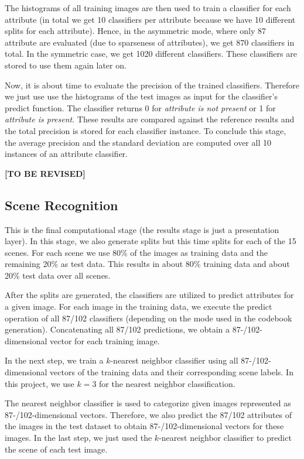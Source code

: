 \documentclass{vldb}
\newcommand{\tbr}{{\color{red}\textbf{[TO BE REVISED]}}}
\begin{document}
The histograms of all training images are then used to train a classifier for each
attribute (in total we get 10 classifiers per attribute because we have 10
different splits for each attribute). Hence, in the asymmetric mode, where only
87 attribute are evaluated (due to sparseness of attributes), we get 870
classifiers in total. In the symmetric case, we get 1020 different classifiers.
These classifiers are stored to use them again later on.

Now, it is about time to evaluate the precision of the trained classifiers.
Therefore we just use use the histograms of the test images as input for the
classifier's predict function. The classifier returns 0 for \emph{attribute is
not present} or 1 for \emph{attribute is present}. These results are compared
against the reference results and the total precision is stored for each
classifier instance. To conclude this stage, the average precision and the
standard deviation are computed over all 10 instances of an attribute classifier.

\tbr

\subsection{Scene Recognition}
\label{subsec:scene-recognition}

This is the final computational stage (the results stage is just a presentation
layer). In this stage, we also generate splits but this time splits for each of
the 15 scenes. For each scene we use 80\% of the images as training data and the
remaining 20\% as test data. This results in about 80\% training data and about
20\% test data over all scenes.

After the splits are generated, the classifiers are utilized to predict attributes
for a given image. For each image in the training data, we execute the predict
operation of all 87/102 classifiers (depending on the mode used in the codebook
generation). Concatenating all 87/102 predictions, we obtain a 87-/102-dimensional
vector for each training image.

In the next step, we train a $k$-nearest neighbor classifier using all
87-/102-dimensional vectors of the training data and their corresponding scene
labels. In this project, we use $k = 3$ for the nearest neighbor classification.

The nearest neighbor classifier is used to categorize given images represented
as 87-/102-dimensional vectors. Therefore, we also predict the 87/102 attributes
of the images in the test dataset to obtain 87-/102-dimensional vectors for
these images. In the last step, we just used the $k$-nearest neighbor classifier
to predict the scene of each test image.
\end{document}
